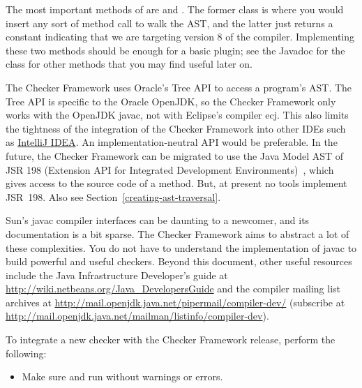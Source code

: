 The most important methods of 
are  and . The former
class is where you would insert any sort of method call to walk the AST\@,
and the latter just returns a constant indicating that we are targeting
version 8 of the compiler. Implementing these two methods should be enough
for a basic plugin; see the Javadoc for the class for other methods that
you may find useful later on.

The Checker Framework uses Oracle's Tree API to access a program's AST\@.
The Tree API is specific to the Oracle OpenJDK, so the Checker Framework only
works with the OpenJDK javac, not with Eclipse's compiler ecj.
This also limits the tightness of
the integration of the Checker Framework into other IDEs such as \href{http://www.jetbrains.com/idea/}{IntelliJ IDEA}\@.
An implementation-neutral API would be preferable.
In the future, the Checker Framework
can be migrated to use the Java Model AST of JSR 198 (Extension API for
Integrated Development Environments)~\cite{JSR198}, which gives access to
the source code of a method.  But, at present no tools
implement JSR~198.  Also see Section~\ref{creating-ast-traversal}.




Sun's javac compiler interfaces can be daunting to a
newcomer, and its documentation is a bit sparse. The Checker Framework
aims to abstract a lot of these complexities.
You do not have to understand the implementation of javac to
build powerful and useful checkers.
Beyond this document,
other useful resources include the Java Infrastructure
Developer's guide at
\url{http://wiki.netbeans.org/Java_DevelopersGuide} and the compiler
mailing list archives at
\url{http://mail.openjdk.java.net/pipermail/compiler-dev/}
(subscribe at
\url{http://mail.openjdk.java.net/mailman/listinfo/compiler-dev}).




To integrate a new checker with the Checker Framework release, perform
the following:

\begin{itemize}

\item Make sure  and  run
without warnings or errors.

\end{itemize}


